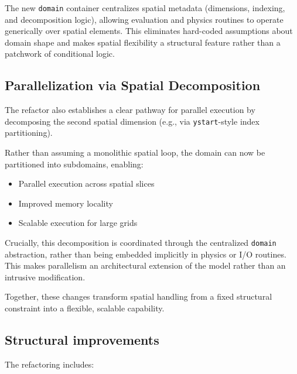 \documentclass[11pt]{scrartcl}
\begin{document}
The new \texttt{domain} container centralizes spatial metadata (dimensions,
indexing, and decomposition logic), allowing evaluation and physics routines
to operate generically over spatial elements. This eliminates hard-coded
assumptions about domain shape and makes spatial flexibility a structural feature
rather than a patchwork of conditional logic.

\subsection{Parallelization via Spatial Decomposition}

The refactor also establishes a clear pathway for parallel execution by
decomposing the second spatial dimension (e.g., via \texttt{ystart}-style
index partitioning).

Rather than assuming a monolithic spatial loop, the domain can now be
partitioned into subdomains, enabling:

\begin{itemize}
\item Parallel execution across spatial slices
\item Improved memory locality
\item Scalable execution for large grids
\end{itemize}

Crucially, this decomposition is coordinated through the centralized
\texttt{domain} abstraction, rather than being embedded implicitly
in physics or I/O routines. This makes parallelism an architectural
extension of the model rather than an intrusive modification.

Together, these changes transform spatial handling from a fixed structural
constraint into a flexible, scalable capability.

\subsection{Structural improvements}

The refactoring includes:
\end{document}
